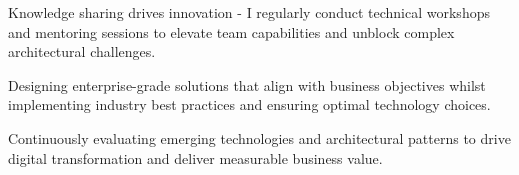 \documentclass[9pt]{style/developercv}
\begin{document}
\begin{minipage}[t]{0.3\textwidth}
    \vspace{-\baselineskip}


  Knowledge sharing drives innovation - I regularly conduct technical workshops and mentoring sessions to elevate team capabilities and unblock complex architectural challenges.

\end{minipage}
\hfill
\begin{minipage}[t]{0.3\textwidth}
    \vspace{-\baselineskip}

    Designing enterprise-grade solutions that align with business objectives whilst implementing industry best practices and ensuring optimal technology choices.

\end{minipage}
\hfill
\begin{minipage}[t]{0.3\textwidth}
    \vspace{-\baselineskip}

  Continuously evaluating emerging technologies and architectural patterns to drive digital transformation and deliver measurable business value.

\end{minipage}
\vspace{0.75cm}

\end{document}
